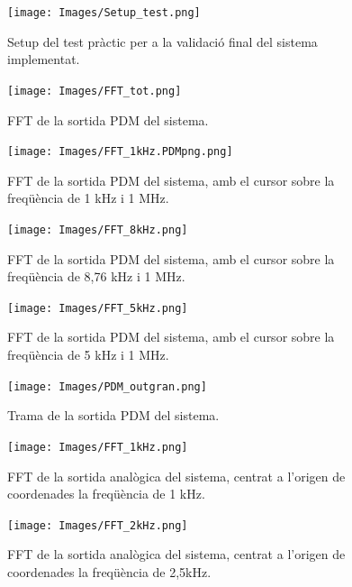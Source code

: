 \begin{figure}
    \centering
    \texttt{[image: Images/Setup\_test.png]}
    \caption{Setup del test pràctic per a la validació final del sistema implementat.}
    \label{figsetup}
\end{figure}

\newpage

\begin{figure}[H]
    \centering
    \texttt{[image: Images/FFT\_tot.png]}
    \caption{FFT de la sortida PDM del sistema.}
    \label{figFFT_tot}
\end{figure}

\begin{figure}[H]
    \centering
    \texttt{[image: Images/FFT\_1kHz.PDMpng.png]}
    \caption{FFT de la sortida PDM del sistema, amb el cursor sobre la freqüència de 1 kHz i 1 MHz.}
    \label{figFFT1kPDM}
\end{figure}

\begin{figure}[H]
    \centering
    \texttt{[image: Images/FFT\_8kHz.png]}
    \caption{FFT de la sortida PDM del sistema, amb el cursor sobre la freqüència de 8,76 kHz i 1 MHz.}
    \label{figFFT8kPDM}
\end{figure}

\begin{figure}[H]
    \centering
    \texttt{[image: Images/FFT\_5kHz.png]}
    \caption{FFT de la sortida PDM del sistema, amb el cursor sobre la freqüència de 5 kHz i 1 MHz.}
    \label{figFFT5kPDM}
\end{figure}

\begin{figure}[H]
    \centering
    \texttt{[image: Images/PDM\_outgran.png]}
    \caption{Trama de la sortida PDM del sistema.}
    \label{figPDM_gran}
\end{figure}

\begin{figure}[H]
    \centering
    \texttt{[image: Images/FFT\_1kHz.png]}
    \caption{FFT de la sortida analògica del sistema, centrat a l'origen de coordenades la freqüència de 1 kHz.}
    \label{figFFT_1kHz}
\end{figure}

\begin{figure}[H]
    \centering
    \texttt{[image: Images/FFT\_2kHz.png]}
    \caption{FFT de la sortida analògica del sistema, centrat a l'origen de coordenades la freqüència de 2,5kHz.}
    \label{fig_FFT2kHz}
\end{figure}

